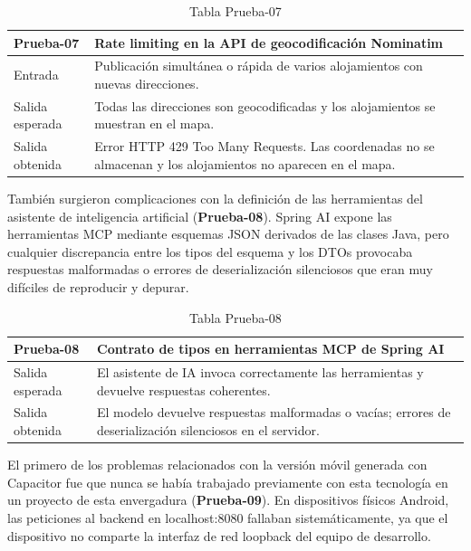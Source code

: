 \begin{table}[H]
\centering
\begin{tabular}{|p{}|p{}|}
\hline
\textbf{Prueba-07} & \textbf{Rate limiting en la API de geocodificación Nominatim} \\ \hline
Entrada & Publicación simultánea o rápida de varios alojamientos con nuevas direcciones. \\ \hline
Salida esperada & Todas las direcciones son geocodificadas y los alojamientos se muestran en el mapa. \\ \hline
Salida obtenida & Error HTTP 429 Too Many Requests. Las coordenadas no se almacenan y los alojamientos no aparecen en el mapa. \\ \hline
\end{tabular}
\caption{Tabla Prueba-07}
\label{tab:prueba07}
\end{table}

También surgieron complicaciones con la definición de las herramientas del asistente de inteligencia artificial (\textbf{Prueba-08}). Spring AI expone las herramientas MCP mediante esquemas JSON derivados de las clases Java, pero cualquier discrepancia entre los tipos del esquema y los DTOs provocaba respuestas malformadas o errores de deserialización silenciosos que eran muy difíciles de reproducir y depurar.

\begin{table}[H]
\centering
\begin{tabular}{|p{}|p{}|}
\hline
\textbf{Prueba-08} & \textbf{Contrato de tipos en herramientas MCP de Spring AI} \\ \hline
Salida esperada & El asistente de IA invoca correctamente las herramientas y devuelve respuestas coherentes. \\ \hline
Salida obtenida & El modelo devuelve respuestas malformadas o vacías; errores de deserialización silenciosos en el servidor. \\ \hline
\end{tabular}
\caption{Tabla Prueba-08}
\label{tab:prueba08}
\end{table}

El primero de los problemas relacionados con la versión móvil generada con Capacitor fue que nunca se había trabajado previamente con esta tecnología en un proyecto de esta envergadura (\textbf{Prueba-09}). En dispositivos físicos Android, las peticiones al backend en localhost:8080 fallaban sistemáticamente, ya que el dispositivo no comparte la interfaz de red loopback del equipo de desarrollo.


